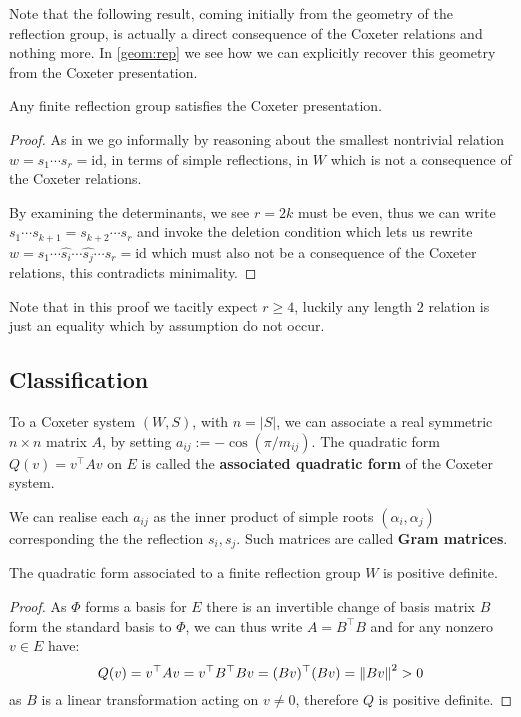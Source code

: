 \documentclass[../main.tex]{subfiles}
\begin{document}
Note that the following result, coming initially from the geometry of the reflection group, is actually a direct consequence of the Coxeter relations and nothing more. In \ref{geom:rep} we see how we can explicitly recover this geometry from the Coxeter presentation.

\begin{theorem}
    Any finite reflection group satisfies the Coxeter presentation.
    \begin{proof}
        As in \cite{Humphreys1990} we go informally by reasoning about the smallest nontrivial relation $w=s_1\cdots s_r = \text{id}$, in terms of simple reflections, in $W$ which is not a consequence of the Coxeter relations.

        By examining the determinants, we see $r=2k$ must be even, thus we can write $s_1\cdots s_{k+1} = s_{k+2}\cdots s_r$ and invoke the deletion condition which lets us rewrite $w=s_1\cdots \hat{s_i}\cdots \hat{s_j}\cdots s_r =\text{id}$ which must also not be a consequence of the Coxeter relations, this contradicts minimality.
    \end{proof}
\end{theorem}

Note that in this proof we tacitly expect $r\geq 4$, luckily any length $2$ relation is just an equality which by assumption do not occur.

\subsection{Classification}

\begin{definition}
    To a Coxeter system $(W,S)$, with $n=|S|$, we can associate a real symmetric $n\times n$ matrix $A$, by setting $a_{ij}:= -\cos(\pi/m_{ij})$. The quadratic form $Q(v) = v^\top A v$ on $E$ is called the \textbf{associated quadratic form} of the Coxeter system.
\end{definition}

We can realise each $a_{ij}$ as the inner product of simple roots $(\alpha_i,\alpha_j)$ corresponding the the reflection $s_i,s_j$. Such matrices are called \textbf{Gram matrices}.

\begin{proposition}
    The quadratic form associated to a finite reflection group $W$ is positive definite.
    \begin{proof}
        As $\Phi$ forms a basis for $E$ there is an invertible change of basis matrix $B$ form the standard basis to $\Phi$, we can thus write $A=B^\top B$ and for any nonzero $v\in E$ have:\[
        Q(v) = v^\top A v = v^\top B^\top B v = (B v)^\top (B v) = \left\lVert B v \right\rVert^2 > 0
        \] as $B$ is a linear transformation acting on $v\neq 0$, therefore $Q$ is positive definite.
    \end{proof}
\end{proposition}
\end{document}
